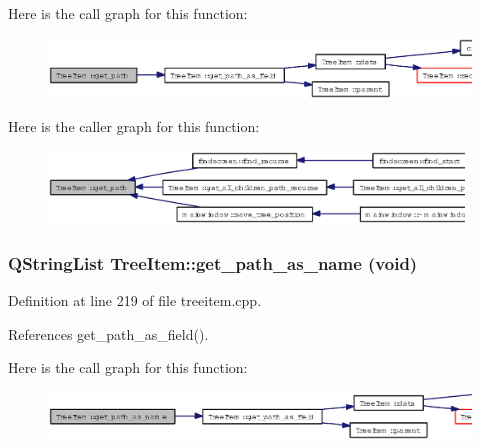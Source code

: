 Here is the call graph for this function:\begin{figure}[H]
\begin{center}
\leavevmode
\includegraphics[width=361pt]{classTreeItem_a47b4b36567db4559ceafc910d70c4da_cgraph}
\end{center}
\end{figure}


Here is the caller graph for this function:\begin{figure}[H]
\begin{center}
\leavevmode
\includegraphics[width=313pt]{classTreeItem_a47b4b36567db4559ceafc910d70c4da_icgraph}
\end{center}
\end{figure}
\subsubsection{\setlength{\rightskip}{0pt plus 5cm}QString\-List Tree\-Item::get\_\-path\_\-as\_\-name (void)}\label{classTreeItem_9137263215b7354cb66591b7730af9e6}




Definition at line 219 of file treeitem.cpp.

References get\_\-path\_\-as\_\-field().

Here is the call graph for this function:\begin{figure}[H]
\begin{center}
\leavevmode
\includegraphics[width=386pt]{classTreeItem_9137263215b7354cb66591b7730af9e6_cgraph}
\end{center}
\end{figure}
